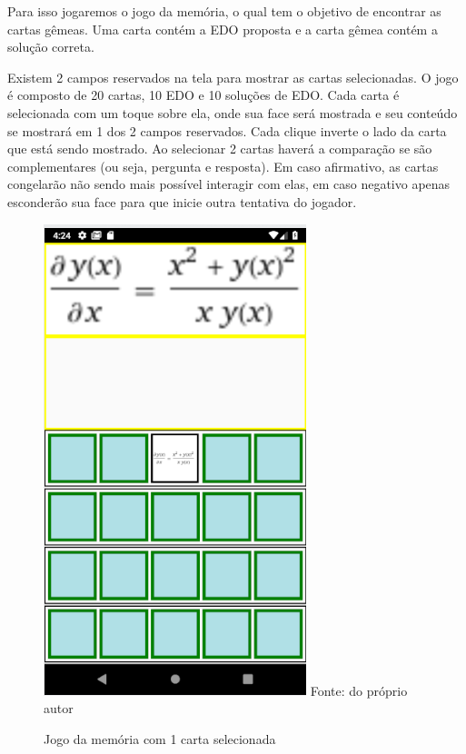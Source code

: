Para isso jogaremos o jogo da memória, o qual tem o objetivo de encontrar as cartas gêmeas. Uma carta contém a EDO proposta e a carta gêmea contém a solução correta.

Existem 2 campos reservados na tela para mostrar as cartas selecionadas. O jogo é composto de 20 cartas, 10 EDO e 10 soluções de EDO. Cada carta é selecionada com um toque sobre ela, onde sua face será mostrada e seu conteúdo se mostrará em 1 dos 2 campos reservados. Cada clique inverte o lado da carta que está sendo mostrado. Ao selecionar 2 cartas haverá a comparação se são complementares (ou seja, pergunta e resposta). Em caso afirmativo, as cartas congelarão não sendo mais possível interagir com elas, em caso negativo apenas esconderão sua face para que inicie outra tentativa do jogador.

\begin{figure}[H]
\centering
\caption{Jogo da memória com 1 carta selecionada}
\includegraphics[scale=0.72]{figuras/resolucao_1imagem.png}
\small{Fonte: do próprio autor}
\end{figure}

